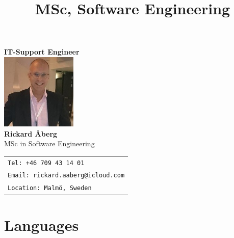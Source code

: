 \documentclass[11pt,a4paper,sans]{moderncv}
\title{MSc, Software Engineering}
\makeatletter
\let\oldmakecvtitle\makecvtitle
\renewcommand*{\makecvtitle}{%
    \vspace*{-1em}
    \begin{center}
      \texttt{[image: \\@photo]}
    \end{center}
    \vspace{0.5em}
    \oldmakecvtitle
  }%
\makeatother
\begin{document}
\begin{center}
    \vspace*{1cm}
    
    {\Huge \textbf{\textcolor{gray!20!black}{IT-Support Engineer}}}\\[1em]
    

    \includegraphics[width=3.6cm]{../../photos/rickardaberg-consultant.jpeg} \\[1em]
    
    {\LARGE \textbf{Rickard Åberg}}\\[0.2em]
    {\large MSc in Software Engineering}\\[2em]
    
{\footnotesize
\begin{tabular}{l}
\texttt{Tel: +46 709 43 14 01} \\
\texttt{Email: rickard.aaberg@icloud.com} \\
\texttt{Location: Malmö, Sweden}
\end{tabular}
}
  
    \vspace*{1cm}
\end{center}
\newpage

\renewcommand*{\namefont}{\LARGE\sffamily\mdseries}
\renewcommand*{\titlefont}{\Large\sffamily\mdseries}






\section{Languages}



\clearpage
\end{document}
